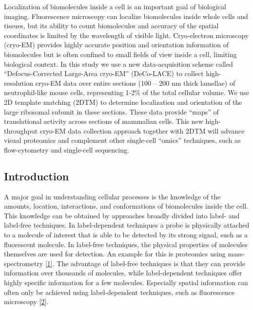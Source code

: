 \documentclass[
]{article}
\begin{document}
Localization of biomolecules inside a cell is an important goal of biological
imaging. Fluorescence microscopy can localize biomolecules inside whole cells
and tissues, but its ability to count biomolecules and accuracy of the spatial
coordinates is limited by the wavelength of visible light. Cryo-electron
microscopy (cryo-EM) provides highly accurate position and orientation
information of biomolecules but is often confined to small fields of view inside
a cell, limiting biological context. In this study we use a new data-acquisition
scheme called ``Defocus-Corrected Large-Area cryo-EM'' (DeCo-LACE) to collect
high-resolution cryo-EM data over entire sections (100 -- 200 nm thick lamellae)
of neutrophil-like mouse cells, representing 1-2\% of the total cellular
volume. We use 2D template matching (2DTM) to determine localization and orientation
of the large ribosomal subunit in these sections. These data provide ``maps'' of translational activity across
sections of mammalian cells. This new high-throughput cryo-EM
data collection approach together with 2DTM will advance visual
proteomics and complement other single-cell ``omics'' techniques, such as
flow-cytometry and single-cell sequencing.

\hypertarget{introduction}{%
\subsection{Introduction}\label{introduction}}

A major goal in understanding cellular processes is the knowledge of the
amounts, location, interactions, and conformations of biomolecules
inside the cell. This knowledge can be obtained by approaches broadly
divided into label- and label-free techniques. In label-dependent
techniques a probe is physically attached to a molecule of interest that
is able to be detected by its strong signal, such as a
fluorescent molecule. In label-free techniques, the physical properties
of molecules themselves are used for detection. An example for this is
proteomics using mass-spectrometry {[}\protect\hyperlink{ref-tSXIKPl7}{1}{]}. The advantage
of label-free techniques is that they can provide information over
thousands of molecules, while label-dependent techniques offer highly specific
information for a few molecules. Especially spatial information can
often only be achieved using label-dependent techniques, such as
fluorescence microscopy {[}\protect\hyperlink{ref-VBmW7Aot}{2}{]}.
\end{document}
